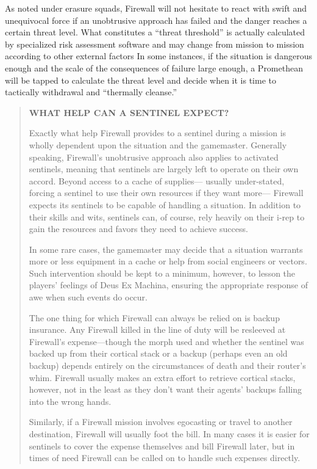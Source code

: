 As noted under erasure squads, Firewall will not 
hesitate to react with swift and unequivocal force if 
an unobtrusive approach has failed and the danger 
reaches a certain threat level. What constitutes a 
``threat threshold'' is actually calculated by specialized
risk assessment software and may change from
mission to mission according to other external factors
In some instances, if the situation is dangerous
enough and the scale of the consequences of failure 
large enough, a Promethean will be tapped to calculate
the threat level and decide when it is time to
tactically withdrawal and ``thermally cleanse.'' 

\begin{quotation}
\begin{large}
\textbf{WHAT HELP CAN A SENTINEL EXPECT?}
\end{large}

Exactly what help Firewall provides to a sentinel
during a mission is wholly dependent upon
the situation and the gamemaster. Generally
speaking, Firewall’s unobtrusive approach also
applies to activated sentinels, meaning that
sentinels are largely left to operate on their
own accord. Beyond access to a cache of supplies—
usually under-stated, forcing a sentinel
to use their own resources if they want more—
Firewall expects its sentinels to be capable of
handling a situation. In addition to their skills
and wits, sentinels can, of course, rely heavily
on their i-rep to gain the resources and favors
they need to achieve success.

In some rare cases, the gamemaster may
decide that a situation warrants more or less
equipment in a cache or help from social engineers
or vectors. Such intervention should be
kept to a minimum, however, to lesson the
players’ feelings of Deus Ex Machina, ensuring
the appropriate response of awe when such
events do occur.

The one thing for which Firewall can always
be relied on is backup insurance. Any Firewall
killed in the line of duty will be resleeved at
Firewall’s expense—though the morph used
and whether the sentinel was backed up from
their cortical stack or a backup (perhaps even
an old backup) depends entirely on the circumstances
of death and their router’s whim. Firewall
usually makes an extra effort to retrieve
cortical stacks, however, not in the least as they
don’t want their agents’ backups falling into
the wrong hands.

Similarly, if a Firewall mission involves egocasting
or travel to another destination, Firewall
will usually foot the bill. In many cases
it is easier for sentinels to cover the expense
themselves and bill Firewall later, but in times
of need Firewall can be called on to handle
such expenses directly.
\end{quotation}

